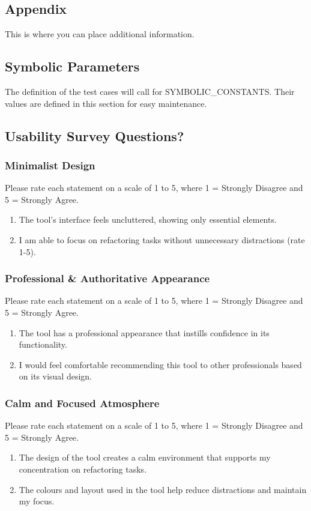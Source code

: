 \documentclass[12pt, titlepage]{article}
\begin{document}
\begin{appendices}

\section{Appendix}

This is where you can place additional information.

\subsection{Symbolic Parameters}

The definition of the test cases will call for SYMBOLIC\_CONSTANTS.
Their values are defined in this section for easy maintenance.

\subsection{Usability Survey Questions?} \label{A.2}

\subsubsection*{Minimalist Design}
Please rate each statement on a scale of 1 to 5, where 1 = Strongly Disagree and 5 = Strongly Agree.
\begin{enumerate}
  \item The tool's interface feels uncluttered, showing only essential elements.
  \item I am able to focus on refactoring tasks without unnecessary distractions (rate 1-5).
\end{enumerate}

\subsubsection*{Professional \& Authoritative Appearance}
Please rate each statement on a scale of 1 to 5, where 1 = Strongly Disagree and 5 = Strongly Agree.
\begin{enumerate}
  \item The tool has a professional appearance that instills confidence in its functionality.
  \item I would feel comfortable recommending this tool to other professionals based on its visual design.
\end{enumerate}

\subsubsection*{Calm and Focused Atmosphere}
Please rate each statement on a scale of 1 to 5, where 1 = Strongly Disagree and 5 = Strongly Agree.
\begin{enumerate}
  \item The design of the tool creates a calm environment that supports my concentration on refactoring tasks.
  \item The colours and layout used in the tool help reduce distractions and maintain my focus.
\end{enumerate}


\end{appendices}
\end{document}
